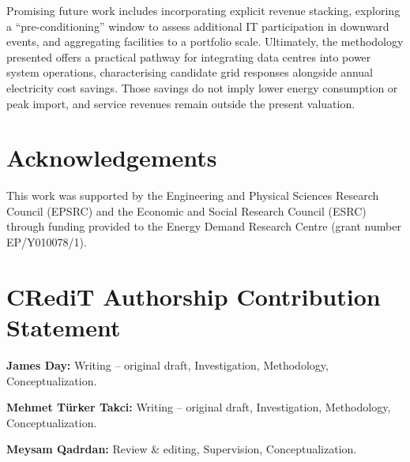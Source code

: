 \documentclass[lettersize,journal]{IEEEtran}
\begin{document}
Promising future work includes incorporating explicit revenue stacking, exploring a ``pre-conditioning'' window to assess additional IT participation in downward events, and aggregating facilities to a portfolio scale. Ultimately, the methodology presented offers a practical pathway for integrating data centres into power system operations, characterising candidate grid responses alongside annual electricity cost savings. Those savings do not imply lower energy consumption or peak import, and service revenues remain outside the present valuation.




\section*{Acknowledgements}

This work was supported by the Engineering and Physical Sciences Research Council (EPSRC) and the Economic and Social Research Council (ESRC) through funding provided to the Energy Demand Research Centre (grant number EP/Y010078/1).

\section*{CRediT Authorship Contribution Statement}

\noindent \textbf{James Day:} Writing – original draft, Investigation, Methodology, Conceptualization.

\medskip
\noindent \textbf{Mehmet Türker Takci:} Writing – original draft, Investigation, Methodology, Conceptualization.


\medskip
\noindent \textbf{Meysam Qadrdan:} Review \& editing, Supervision, Conceptualization.
\end{document}
